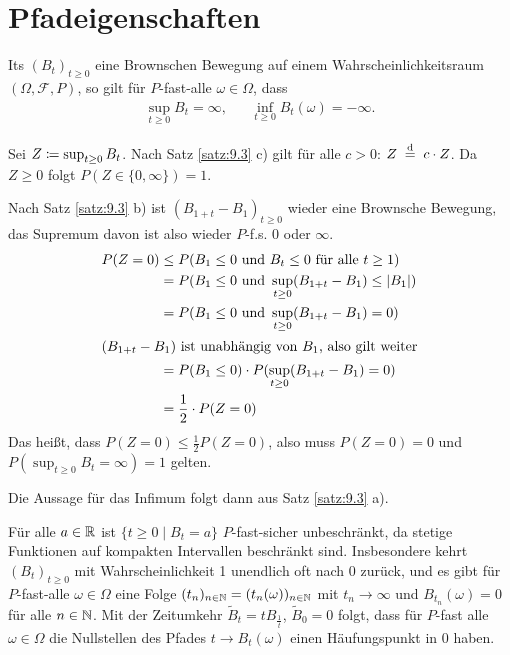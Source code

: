 \documentclass[a4paper,twoside,DIV15,BCOR12mm]{scrbook}
\newcommand{\cF}{\mathcal F}
\begin{document}
\section{Pfadeigenschaften}

\begin{satz}
Its $(B_t)_{t\ge 0}$ eine Brownschen Bewegung auf einem Wahrscheinlichkeitsraum $(\Omega, \cF, P)$, so gilt für $P$-fast-alle $\omega\in \Omega$, dass 
\begin{align*}
\sup_{t\ge 0} B_t = \infty, &&\inf_{t\ge 0}B_t(\omega)=-\infty.
\end{align*}
\end{satz}
\begin{beweis}
Sei $Z\da \sup_{t\ge 0}B_t$. Nach Satz \ref{satz:9.3} c) gilt für alle $c>0$:
$Z\gleichnach{d} c\cdot Z$. Da $Z\ge 0$ folgt $P(Z \in \{0,\infty\})=1$.

Nach Satz \ref{satz:9.3} b) ist $(B_{1+t}-B_1)_{t\ge 0}$ wieder eine Brownsche Bewegung, das Supremum davon ist also wieder $P$-f.s. $0$ oder $\infty$.
\begin{align*}
P(Z=0) &\le P(B_1\le 0\text{ und }B_t\le 0\text{ für alle } t\ge 1) \\
&=P(B_1\le 0 \text{ und } \sup_{t\ge 0}(B_{1+t}-B_1) \le |B_1|) \\
&= P(B_1 \le 0 \text{ und } \sup_{t\ge 0}(B_{1+t}-B_1) = 0) \\
\intertext{$(B_{1+t}-B_1)$ ist unabhängig von $B_1$, also gilt weiter}
&= P(B_1\le 0)\cdot P(\sup_{t\ge 0}(B_{1+t}-B_1) = 0) \\
&= \frac12 \cdot P(Z=0)
\end{align*}
Das heißt, dass $P(Z=0)\le \frac 12 P(Z=0)$, also muss $P(Z=0)=0$ und $P(\sup_{t\ge 0}B_t =\infty) = 1$ gelten.

Die Aussage für das Infimum folgt dann aus Satz \ref{satz:9.3} a).
\end{beweis}


\begin{bemerkung}
Für alle $a\in \mathbb{R}$ ist $\{t\ge 0\mid B_t=a\}$ $P$-fast-sicher unbeschränkt, da stetige Funktionen auf kompakten Intervallen beschränkt sind. Insbesondere kehrt $(B_t)_{t\ge 0}$ mit Wahrscheinlichkeit 1 unendlich oft nach 0 zurück, und es gibt für $P$-fast-alle $\omega\in\Omega$ eine Folge $(t_n)_{n\in \mathbb{N}}  = (t_n(\omega))_{n\in\mathbb{N}}$ mit $t_n\to \infty$ und $B_{t_n}(\omega)=0$ für alle $n\in\mathbb{N}$. Mit der Zeitumkehr $\tilde B_t=tB_{\frac 1t}$, $\tilde B_0=0$ folgt, dass für $P$-fast alle $\omega\in \Omega$ die Nullstellen des Pfades $t\to B_t(\omega)$ einen Häufungspunkt in $0$ haben.
\end{bemerkung}
\end{document}

